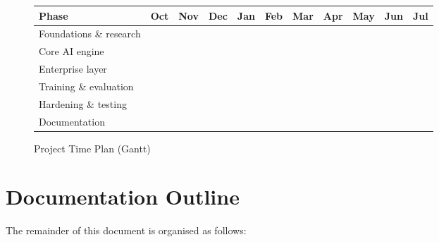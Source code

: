 \documentclass[12pt,a4paper,oneside]{report}
\begin{document}
\begin{figure}[H]
\centering
\caption{Project Time Plan (Gantt)}
\label{fig:gantt}
\begin{tabularx}{\textwidth}{L{3.8cm}*{10}{C{0.85cm}}}
\toprule
\textbf{Phase} & \textbf{Oct} & \textbf{Nov} & \textbf{Dec} & \textbf{Jan} & \textbf{Feb}
              & \textbf{Mar} & \textbf{Apr} & \textbf{May} & \textbf{Jun} & \textbf{Jul} \\
\midrule
Foundations \& research  &  &  & & & & & & & & \\
Core AI engine           & &  &  &  & & & & & & \\
Enterprise layer         & & & &  &  &  & & & & \\
Training \& evaluation   & & & & & &  &  & & & \\
Hardening \& testing     & & & & & & & &  & & \\
Documentation            & &  &  &  &  &  &  &  &  &  \\
\bottomrule
\end{tabularx}
\end{figure}

\section{Documentation Outline}

The remainder of this document is organised as follows:
\end{document}
